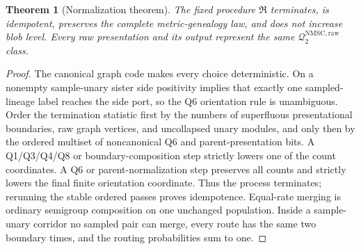 \documentclass[11pt]{article}
\newtheorem{theorem}{Theorem}[section]
\newcommand{\Qraw}{\mathcal Q^{\mathrm{NMSC,raw}}_2}
\newcommand{\Rraw}{\mathfrak R}
\begin{document}
\begin{theorem}[Normalization theorem]
\label{thm:normalization}
The fixed procedure $\Rraw$ terminates, is idempotent, preserves the complete metric-genealogy law, and does not increase blob level.  Every raw presentation and its output represent the same $\Qraw$ class.
\end{theorem}

\begin{proof}
The canonical graph code makes every choice deterministic.  On a nonempty
sample-unary sister side positivity implies that exactly one sampled-lineage
label reaches the side port, so the Q6 orientation rule is unambiguous.  Order
the termination statistic first by the numbers of superfluous presentational
boundaries, raw graph vertices, and uncollapsed unary modules, and only then by
the ordered multiset of noncanonical Q6 and parent-presentation bits.  A
Q1/Q3/Q4/Q8 or boundary-composition step strictly lowers one of the count
coordinates.  A Q6 or parent-normalization step preserves all counts and
strictly lowers the final finite orientation coordinate.  Thus the process
terminates; rerunning the stable ordered passes proves idempotence.  Equal-rate
merging is ordinary semigroup composition on one unchanged population.  Inside
a sample-unary corridor no sampled pair can merge, every route has the same two
boundary times, and the routing probabilities sum to one.


\end{proof}
\end{document}
